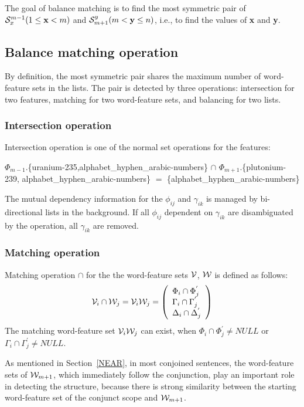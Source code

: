 The goal of balance matching is to find the most symmetric
pair of ${\cal S}_{x}^{m-1} ( 1 \leq {\bf x} < m )$ and ${\cal S}_{m+1}^{y}
( m < {\bf y} \leq n )$, i.e., to find the values of {\bf x} and {\bf y}.

\subsection{Balance matching operation}

By definition, the most symmetric pair shares the maximum number of
word-feature sets in the lists. The pair is detected by three
operations: intersection for two features, matching
for two word-feature sets, and balancing for
two lists.

\subsubsection{Intersection operation}

Intersection operation is one of the normal set operations for the
features:

$\Phi_{m-1}$.\{uranium-235,alphabet\_hyphen\_arabic-numbers\} $\cap$ 
$\Phi_{m+1}$.\{plutonium-239, alphabet\_hyphen\_arabic-numbers\} 
$  = $ \{alphabet\_hyphen\_arabic-numbers\}

The mutual dependency information for the ${\phi}_{ij}$ and
${\gamma}_{ik}$ is managed by bi-directional lists in the
background.  If all ${\phi}_{ij}$ dependent on ${\gamma}_{ik}$ are
disambiguated by the operation, all ${\gamma}_{ik}$ are removed.

\subsubsection{Matching operation}

Matching operation $\cap$ for the the word-feature sets ${\cal V}$,
${\cal W}$ is defined as follows:
\[
{\cal V}_{i}\cap{\cal W}_{j} = {\cal V}_{i}{\cal W}_{j} =
\left( \begin{array}{lll}
\Phi_{i} \cap \Phi_{j}^{'} \\
\Gamma_{i} \cap \Gamma_{j}^{'} \\ 
\Delta_{i} \cap \Delta_{j}^{'} \end{array} \right) 
\]
The matching word-feature set ${\cal V}_{i}{\cal W}_{j}$ can exist,
when  $\Phi_{i} \cap
\Phi_{j}^{'} \neq NULL$ or $\Gamma_{i} \cap \Gamma_{j}^{'} \neq NULL$.


As mentioned in Section~\ref{NEAR}, in most conjoined
sentences, the word-feature sets of ${\cal W}_{m+1}$, which immediately
follow the conjunction, play an important role in detecting the
structure, because there is strong similarity between the starting
word-feature set of the conjunct scope and ${\cal W}_{m+1}$.

